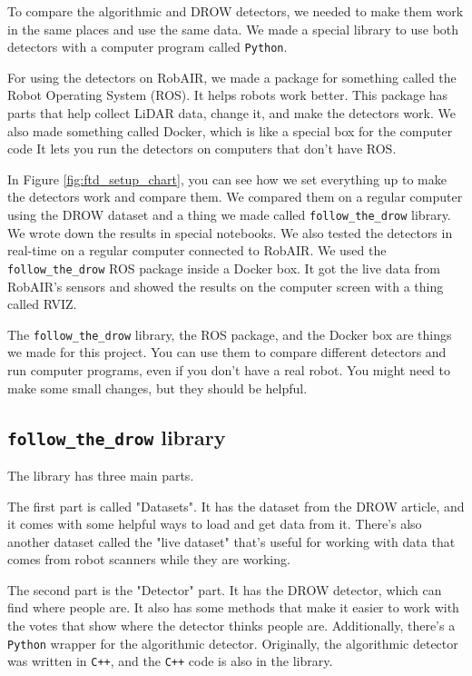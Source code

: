 \documentclass{article}
\begin{document}
To compare the algorithmic and DROW detectors, we needed to make them work in the same places and use the same data.
We made a special library to use both detectors with a computer program called \texttt{Python}.

For using the detectors on RobAIR, we made a package for something called the Robot Operating System (ROS)\cite{ros_site}.
It helps robots work better.
This package has parts that help collect LiDAR data, change it, and make the detectors work.
We also made something called Docker, which is like a special box for the computer code
It lets you run the detectors on computers that don't have ROS.

In Figure \ref{fig:ftd_setup_chart}, you can see how we set everything up to make the detectors work and compare them.
We compared them on a regular computer using the DROW dataset and a thing we made called \texttt{follow\_the\_drow} library.
We wrote down the results in special notebooks.
We also tested the detectors in real-time on a regular computer connected to RobAIR.
We used the \texttt{follow\_the\_drow} ROS package inside a Docker box.
It got the live data from RobAIR's sensors and showed the results on the computer screen with a thing called RVIZ\cite{rviz_wiki}.

The \texttt{follow\_the\_drow} library, the ROS package, and the Docker box are things we made for this project.
You can use them to compare different detectors and run computer programs, even if you don't have a real robot.
You might need to make some small changes, but they should be helpful.

\subsection{\texttt{follow\_the\_drow} library}

The library has three main parts.

The first part is called "Datasets".
It has the dataset from the DROW article, and it comes with some helpful ways to load and get data from it.
There's also another dataset called the "live dataset" that's useful for working with data that comes from robot scanners while they are working.

The second part is the "Detector" part.
It has the DROW detector, which can find where people are.
It also has some methods that make it easier to work with the votes that show where the detector thinks people are.
Additionally, there's a \texttt{Python} wrapper for the algorithmic detector.
Originally, the algorithmic detector was written in \texttt{C++}, and the \texttt{C++} code is also in the library.
\end{document}
